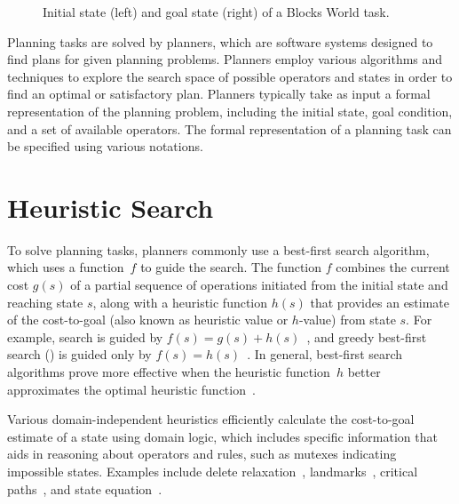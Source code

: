 \documentclass[ppgc,diss,english]{iiufrgs}
\begin{document}
\begin{figure}[ht]
\caption[Initial state of a Blocks World task]{Initial state (left) and goal state (right) of a Blocks World task.}
\vspace{\baselineskip}
\centering
{}
\label{fig:intro-blocks}
\end{figure}

Planning tasks are solved by planners, which are software systems designed to find plans for given planning problems. Planners employ various algorithms and techniques to explore the search space of possible operators and states in order to find an optimal or satisfactory plan. Planners typically take as input a formal representation of the planning problem, including the initial state, goal condition, and a set of available operators. The formal representation of a planning task can be specified using various notations.

\section{Heuristic Search}
\label{sec:intro-heuristic-search}
To solve planning tasks, planners commonly use a best-first search algorithm, which uses a function~$f$ to guide the search. The function $f$ combines the current cost $g(s)$ of a partial sequence of operations initiated from the initial state and reaching state $s$, along with a heuristic function $h(s)$ that provides an estimate of the cost-to-goal (also known as heuristic value or $h$-value) from state $s$. For example, \astar search is guided by $f(s)=g(s)+h(s)$~\cite{hart-et-al-ieeessc1968}, and greedy best-first search (\gbfs) is guided only by $f(s)=h(s)$~\cite{doran-michie-rsl1966}. In general, best-first search algorithms prove more effective when the heuristic function~$h$ better approximates the optimal heuristic function~\hstar.

Various domain-independent heuristics efficiently calculate the cost-to-goal estimate of a state using domain logic, which includes specific information that aids in reasoning about operators and rules, such as mutexes indicating impossible states. Examples include delete relaxation~\cite{Hoffmann.Nebel/2001}, landmarks~\cite{hoffmann-et-al-jair2004,Karpas.Domshlak/2009}, critical paths~\cite{haslum-geffner-aips2000}, and state equation~\cite{bonet-ijcai2013}.
\end{document}
